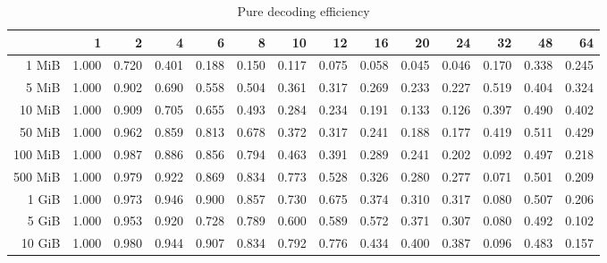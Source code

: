 \begin{centering}
\begin{table}[!h]
	\caption{Pure decoding efficiency}
	\begin{tabular}{rrrrrrrrrrrrrr}
		\toprule
		\diagbox[width=7em]{Size}{Threads} &    1  &    2  &    4  &    6  &    8  &    10 &    12 &    16 &    20 &    24 &    32 &    48 &    64 \\
		\midrule
		1 MiB   & 1.000 & 0.720 & 0.401 & 0.188 & 0.150 & 0.117 & 0.075 & 0.058 & 0.045 & 0.046 & 0.170 & 0.338 & 0.245 \\
		5 MiB   & 1.000 & 0.902 & 0.690 & 0.558 & 0.504 & 0.361 & 0.317 & 0.269 & 0.233 & 0.227 & 0.519 & 0.404 & 0.324 \\
		10 MiB  & 1.000 & 0.909 & 0.705 & 0.655 & 0.493 & 0.284 & 0.234 & 0.191 & 0.133 & 0.126 & 0.397 & 0.490 & 0.402 \\
		50 MiB  & 1.000 & 0.962 & 0.859 & 0.813 & 0.678 & 0.372 & 0.317 & 0.241 & 0.188 & 0.177 & 0.419 & 0.511 & 0.429 \\
		100 MiB & 1.000 & 0.987 & 0.886 & 0.856 & 0.794 & 0.463 & 0.391 & 0.289 & 0.241 & 0.202 & 0.092 & 0.497 & 0.218 \\
		500 MiB & 1.000 & 0.979 & 0.922 & 0.869 & 0.834 & 0.773 & 0.528 & 0.326 & 0.280 & 0.277 & 0.071 & 0.501 & 0.209 \\
		1 GiB   & 1.000 & 0.973 & 0.946 & 0.900 & 0.857 & 0.730 & 0.675 & 0.374 & 0.310 & 0.317 & 0.080 & 0.507 & 0.206 \\
		5 GiB   & 1.000 & 0.953 & 0.920 & 0.728 & 0.789 & 0.600 & 0.589 & 0.572 & 0.371 & 0.307 & 0.080 & 0.492 & 0.102 \\
		10 GiB  & 1.000 & 0.980 & 0.944 & 0.907 & 0.834 & 0.792 & 0.776 & 0.434 & 0.400 & 0.387 & 0.096 & 0.483 & 0.157 \\
		\bottomrule
	\end{tabular}
\end{table}
\end{centering}
